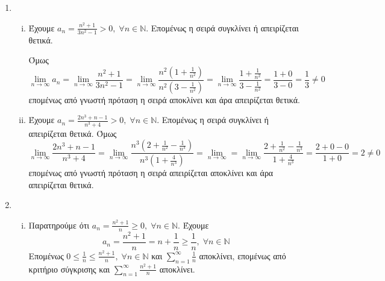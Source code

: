 


\everymath{\displaystyle}



\begin{center}
\end{center}

\vspace{\baselineskip}

\begin{enumerate}
    \item 
    \begin{enumerate}[i)]
        \item Έχουμε $ a_{n}= \frac{n^{2}+1}{3n^{2}-1} > 0, \; \forall n \in 
            \mathbb{N} $. Επομένως η σειρά συγκλίνει ή απειρίζεται θετικά.

            Όμως \[ \lim_{n \to \infty} a_{n} = \lim_{n \to \infty} 
                \frac{n^{2}+1}{3n^{2}-1} = \lim_{n \to \infty} 
                \frac{n^{2}(1+ \frac{1}{n^{{2}}})}{n^{2}(3- \frac{1}{n^{2}})} = 
                \lim_{n \to \infty} \frac{1 + \frac{1}{n^{2}}}{3- \frac{1}{n^{2}}} = 
                \frac{1+0}{3-0} = \frac{1}{3} \neq 0
            \] επομένως από γνωστή πρόταση η σειρά αποκλίνει και άρα απειρίζεται 
            θετικά.

        \item Έχουμε $ a_{n}= \frac{2n^{3}+n-1}{n^{3}+4} > 0, \; \forall n \in 
            \mathbb{N} $. Επομένως η σειρά συγκλίνει ή απειρίζεται θετικά.
            Όμως
            \[
                \lim_{n \to \infty} \frac{2n^{3}+n-1}{n^{3}+4} = \lim_{n \to \infty}
                \frac{n^{3}(2+ \frac{1}{n^{2}}- \frac{1}{n^{3}})}{n^{3}
                (1+ \frac{4}{n^{3}})} = \lim_{n \to \infty} = 
                \lim_{n \to \infty} \frac{2+ \frac{1}{n^{2}}- 
                \frac{1}{n^{3}}}{1 + \frac{4}{n^{3}}} =  
                \frac{2+0-0}{1+0} = 2 \neq 0
            \]
            επομένως από γνωστή πρόταση η σειρά απειρίζεται αποκλίνει και 
            άρα απειρίζεται θετικά. 
    \end{enumerate}

\item 
    \begin{enumerate}[i)]
        \item Παρατηρούμε ότι $ a_{n} = \frac{n^{2}+1}{n} \geq 0, \; \forall n 
            \in \mathbb{N} $. Έχουμε 
            \[
                a_{n} = \frac{n^{2}+1}{n} = n + \frac{1}{n} \geq 
                \frac{1}{n}, \; \forall n \in \mathbb{N}  
            \]
            Επομένως $ 0 \leq \frac{1}{n} \leq \frac{n^{2}+1}{n}, \; \forall n \in
            \mathbb{N}  $ και $ \sum_{n=1}^{\infty} \frac{1}{n} $ αποκλίνει, επομένως 
            από κριτήριο σύγκρισης και $ \sum_{n=1}^{\infty} \frac{n^{2}+1}{n} $ 
            αποκλίνει.


\end{enumerate}
\end{enumerate}
